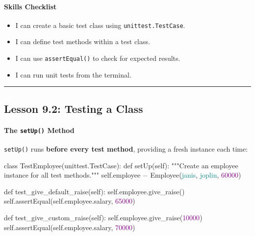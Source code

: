 \documentclass[
  justified,
  openright,
]{tufte-book}
\let\subsubsection\paragraph
\let\paragraph\paragraph
\newcommand{\CommentTok}[1]{\textcolor{MidGray}{#1}}
\newcommand{\DecValTok}[1]{\textcolor{Purple}{#1}}
\newcommand{\KeywordTok}[1]{\textcolor{BrandBlue}{#1}}
\newcommand{\NormalTok}[1]{#1}
\newcommand{\OperatorTok}[1]{\textcolor{DarkGray}{#1}}
\newcommand{\StringTok}[1]{\textcolor{Teal}{#1}}
\newcommand{\VariableTok}[1]{#1}
\newenvironment{Shaded}{%
  \begin{snugshade}
}{%
  \end{snugshade}
}
\let\subsubsection\paragraph
\let\paragraph\paragraph
\providecommand{\tightlist}{%
  \setlength{\itemsep}{0pt}\setlength{\parskip}{0pt}}
\begin{document}
\subsubsection{Skills Checklist}\label{skills-checklist-42}

\begin{itemize}
\tightlist
\item[$\square$]
  I can create a basic test class using \texttt{unittest.TestCase}.
\item[$\square$]
  I can define test methods within a test class.
\item[$\square$]
  I can use \texttt{assertEqual()} to check for expected results.
\item[$\square$]
  I can run unit tests from the terminal.
\end{itemize}

\begin{center}\rule{0.5\linewidth}{0.5pt}\end{center}

\subsection{Lesson 9.2: Testing a
Class}\label{lesson-9.2-testing-a-class}

\subsubsection{\texorpdfstring{The \texttt{setUp()}
Method}{The setUp() Method}}\label{the-setup-method}

\texttt{setUp()} runs \textbf{before every test method}, providing a
fresh instance each time:

\begin{Shaded}
\begin{Highlighting}[]
\KeywordTok{class}\NormalTok{ TestEmployee(unittest.TestCase):}
    \KeywordTok{def}\NormalTok{ setUp(}\VariableTok{self}\NormalTok{):}
        \CommentTok{"""Create an employee instance for all test methods."""}
        \VariableTok{self}\NormalTok{.employee }\OperatorTok{=}\NormalTok{ Employee(}\StringTok{\textquotesingle{}janis\textquotesingle{}}\NormalTok{, }\StringTok{\textquotesingle{}joplin\textquotesingle{}}\NormalTok{, }\DecValTok{60000}\NormalTok{)}

    \KeywordTok{def}\NormalTok{ test\_give\_default\_raise(}\VariableTok{self}\NormalTok{):}
        \VariableTok{self}\NormalTok{.employee.give\_raise()}
        \VariableTok{self}\NormalTok{.assertEqual(}\VariableTok{self}\NormalTok{.employee.salary, }\DecValTok{65000}\NormalTok{)}

    \KeywordTok{def}\NormalTok{ test\_give\_custom\_raise(}\VariableTok{self}\NormalTok{):}
        \VariableTok{self}\NormalTok{.employee.give\_raise(}\DecValTok{10000}\NormalTok{)}
        \VariableTok{self}\NormalTok{.assertEqual(}\VariableTok{self}\NormalTok{.employee.salary, }\DecValTok{70000}\NormalTok{)}
\end{Highlighting}
\end{Shaded}
\end{document}
